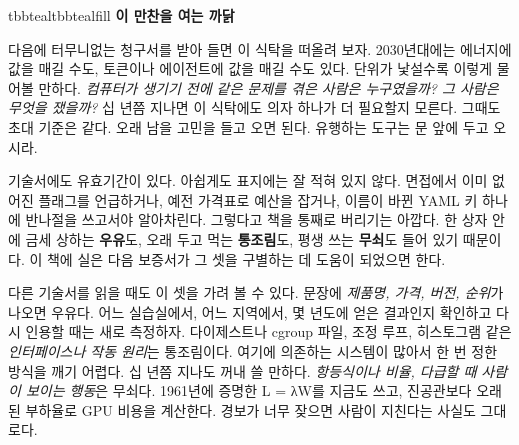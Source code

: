 \begin{calloutbox}{tbbteal}{tbbtealfill}
{\normalsize\bfseries\color{tbbteal}이 만찬을 여는 까닭}\par\vspace{3pt}
다음에 터무니없는 청구서를 받아 들면 이 식탁을 떠올려 보자. 2030년대에는 에너지에 값을 매길 수도, 토큰이나 에이전트에 값을 매길 수도 있다. 단위가 낯설수록 이렇게 물어볼 만하다. \textit{컴퓨터가 생기기 전에 같은 문제를 겪은 사람은 누구였을까? 그 사람은 무엇을 쟀을까?} 십 년쯤 지나면 이 식탁에도 의자 하나가 더 필요할지 모른다. 그때도 초대 기준은 같다. 오래 남을 고민을 들고 오면 된다. 유행하는 도구는 문 앞에 두고 오시라.
\end{calloutbox}

\vspace{4.0pt}


기술서에도 유효기간이 있다. 아쉽게도 표지에는 잘 적혀 있지 않다. 면접에서 이미 없어진 플래그를 언급하거나, 예전 가격표로 예산을 잡거나, 이름이 바뀐 YAML 키 하나에 반나절을 쓰고서야 알아차린다. 그렇다고 책을 통째로 버리기는 아깝다. 한 상자 안에 금세 상하는 \textbf{우유}도, 오래 두고 먹는 \textbf{통조림}도, 평생 쓰는 \textbf{무쇠}도 들어 있기 때문이다. 이 책에 실은 다음 보증서가 그 셋을 구별하는 데 도움이 되었으면 한다.

다른 기술서를 읽을 때도 이 셋을 가려 볼 수 있다. 문장에 \textit{제품명, 가격, 버전, 순위}가 나오면 우유다. 어느 실습실에서, 어느 지역에서, 몇 년도에 얻은 결과인지 확인하고 다시 인용할 때는 새로 측정하자. 다이제스트나 cgroup 파일, 조정 루프, 히스토그램 같은 \textit{인터페이스나 작동 원리}는 통조림이다. 여기에 의존하는 시스템이 많아서 한 번 정한 방식을 깨기 어렵다. 십 년쯤 지나도 꺼내 쓸 만하다. \textit{항등식이나 비율, 다급할 때 사람이 보이는 행동}은 무쇠다. 1961년에 증명한 L = λW를 지금도 쓰고, 진공관보다 오래된 부하율로 GPU 비용을 계산한다. 경보가 너무 잦으면 사람이 지친다는 사실도 그대로다.

